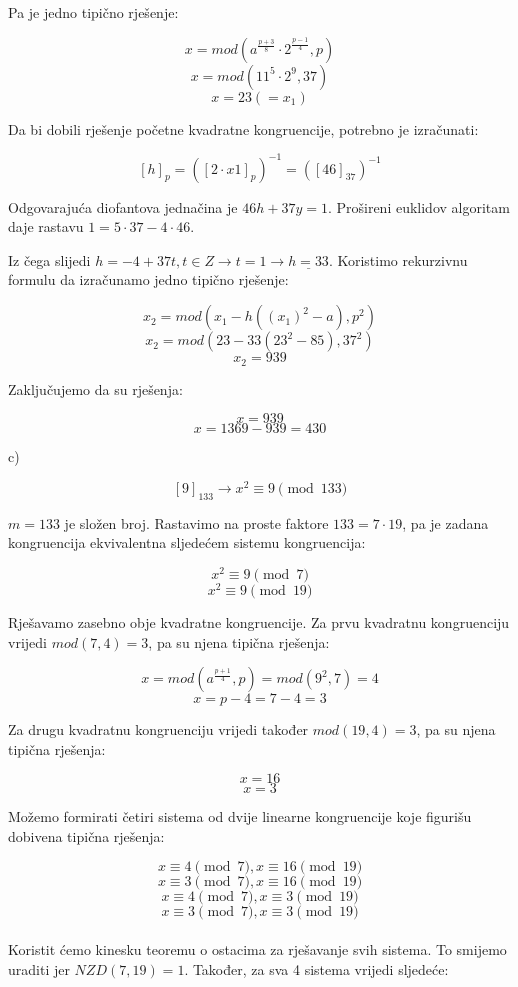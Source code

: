 \documentclass[12pt]{article}
\begin{document}
Pa je jedno tipično rješenje:

$$x = mod(a^{\frac{p + 3}{8}} \cdot 2^{\frac{p - 1}{4}}, p)$$
$$x = mod(11^5 \cdot 2^9, 37)$$
$$x = 23 (= x_{1})$$\vspace{1mm}

Da bi dobili rješenje početne kvadratne kongruencije, potrebno je izračunati:

$$[h]_{p} = ([2\cdot x1]_{p})^{-1} = ([46]_{37})^{-1}$$\vspace{1mm}

Odgovarajuća diofantova jednačina je $46h + 37y = 1$. Prošireni euklidov algoritam daje rastavu $1 = 5 \cdot 37 - 4 \cdot 46$.

Iz čega slijedi $h = -4 + 37t, t \in Z \to t = 1 \to \underline{h = 33}$. Koristimo rekurzivnu formulu da izračunamo jedno tipično rješenje:

$$x_{2} = mod(x_{1} - h((x_{1})^2 - a), p^2)$$
$$x_{2} = mod(23 - 33(23^2 - 85), 37^2)$$
$$x_{2} = 939$$\vspace{1mm}

Zaključujemo da su rješenja:

$$x = 939$$
$$x = 1369 - 939 = 430$$\vspace{1mm}

c)

$$[9]_{133} \to x^2\equiv 9 \pmod{133}$$\vspace{1mm}

$m = 133$ je složen broj. Rastavimo na proste faktore $133 = 7 \cdot 19$, pa je zadana kongruencija ekvivalentna sljedećem sistemu kongruencija:

$$x^2 \equiv 9 \pmod{7}$$
$$x^2 \equiv 9 \pmod{19}$$\vspace{1mm}

Rješavamo zasebno obje kvadratne kongruencije. Za prvu kvadratnu kongruenciju vrijedi $mod(7, 4) = 3$, pa su njena tipična rješenja:

$$x = mod(a^{\frac{p + 1}{4}}, p) = mod(9^2, 7) = 4$$
$$x = p - 4 = 7 - 4 = 3$$\vspace{1mm}

Za drugu kvadratnu kongruenciju vrijedi također $mod(19, 4) = 3$, pa su njena tipična rješenja:

$$x = 16$$
$$x = 3$$\vspace{1mm}

Možemo formirati četiri sistema od dvije linearne kongruencije koje figurišu dobivena tipična rješenja:

\[
x \equiv 4 \pmod{7}, x \equiv 16 \pmod{19} \label{eq:Z6eq1} \tag{1}
\]
\[
x \equiv 3 \pmod{7}, x \equiv 16 \pmod{19} \label{eq:Z6eq2} \tag{2}
\]
\[
x \equiv 4 \pmod{7}, x \equiv 3 \pmod{19} \label{eq:Z6eq3} \tag{3}
\]
\[
x \equiv 3 \pmod{7}, x \equiv 3 \pmod{19} \label{eq:Z6eq4} \tag{4}
\]
\\
Koristit ćemo kinesku teoremu o ostacima za rješavanje svih sistema. To smijemo uraditi jer $NZD(7, 19) = 1$. Također, za sva 4 sistema vrijedi sljedeće:
\end{document}
